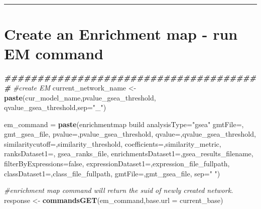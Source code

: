 \documentclass[
]{book}
\newenvironment{Shaded}{\begin{snugshade}}{\end{snugshade}}
\newcommand{\AttributeTok}[1]{\textcolor[rgb]{0.13,0.29,0.53}{#1}}
\newcommand{\CommentTok}[1]{\textcolor[rgb]{0.56,0.35,0.01}{\textit{#1}}}
\newcommand{\DocumentationTok}[1]{\textcolor[rgb]{0.56,0.35,0.01}{\textbf{\textit{#1}}}}
\newcommand{\FunctionTok}[1]{\textcolor[rgb]{0.13,0.29,0.53}{\textbf{#1}}}
\newcommand{\NormalTok}[1]{#1}
\newcommand{\OtherTok}[1]{\textcolor[rgb]{0.56,0.35,0.01}{#1}}
\newcommand{\StringTok}[1]{\textcolor[rgb]{0.31,0.60,0.02}{#1}}
\begin{document}
\begin{center}\rule{0.5\linewidth}{0.5pt}\end{center}

\section{Create an Enrichment map - run EM command}\label{create-an-enrichment-map---run-em-command-1}

\begin{Shaded}
\begin{Highlighting}[]
\DocumentationTok{\#\#\#\#\#\#\#\#\#\#\#\#\#\#\#\#\#\#\#\#\#\#\#\#\#\#\#\#\#\#\#\#\#\#\#\#\#\#\#}
\CommentTok{\#create EM}
\NormalTok{current\_network\_name }\OtherTok{\textless{}{-}} \FunctionTok{paste}\NormalTok{(cur\_model\_name,pvalue\_gsea\_threshold,}
\NormalTok{                              qvalue\_gsea\_threshold,}\AttributeTok{sep=}\StringTok{"\_"}\NormalTok{)}

\NormalTok{em\_command }\OtherTok{=} \FunctionTok{paste}\NormalTok{(}\StringTok{\textquotesingle{}enrichmentmap build analysisType="gsea" gmtFile=\textquotesingle{}}\NormalTok{,}
\NormalTok{                                                              gmt\_gsea\_file,}
                   \StringTok{\textquotesingle{}pvalue=\textquotesingle{}}\NormalTok{,pvalue\_gsea\_threshold, }
                   \StringTok{\textquotesingle{}qvalue=\textquotesingle{}}\NormalTok{,qvalue\_gsea\_threshold,}
                   \StringTok{\textquotesingle{}similaritycutoff=\textquotesingle{}}\NormalTok{,similarity\_threshold,}
                   \StringTok{\textquotesingle{}coefficients=\textquotesingle{}}\NormalTok{,similarity\_metric,}
                   \StringTok{\textquotesingle{}ranksDataset1=\textquotesingle{}}\NormalTok{, gsea\_ranks\_file,}
                   \StringTok{\textquotesingle{}enrichmentsDataset1=\textquotesingle{}}\NormalTok{,gsea\_results\_filename, }
                   \StringTok{\textquotesingle{}filterByExpressions=false\textquotesingle{}}\NormalTok{,}
                   \StringTok{\textquotesingle{}expressionDataset1=\textquotesingle{}}\NormalTok{,expression\_file\_fullpath,}
                   \StringTok{\textquotesingle{}classDataset1=\textquotesingle{}}\NormalTok{,class\_file\_fullpath,}
                   \StringTok{\textquotesingle{}gmtFile=\textquotesingle{}}\NormalTok{,gmt\_gsea\_file,}
                   \AttributeTok{sep=}\StringTok{" "}\NormalTok{)}

\CommentTok{\#enrichment map command will return the suid of newly created network.}
\NormalTok{response }\OtherTok{\textless{}{-}} \FunctionTok{commandsGET}\NormalTok{(em\_command,}\AttributeTok{base.url =}\NormalTok{ current\_base)}


\end{Highlighting}
\end{Shaded}
\end{document}
